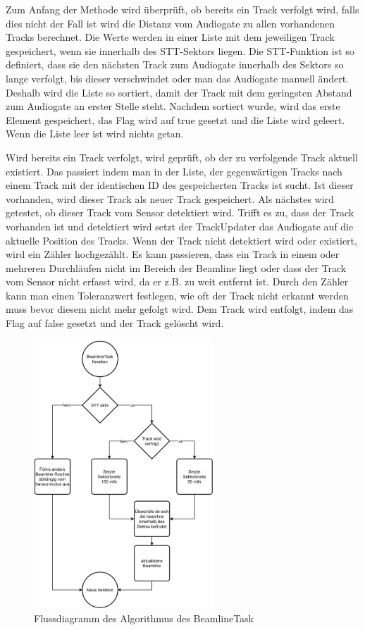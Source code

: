 Zum Anfang der Methode wird überprüft, ob bereits ein Track verfolgt wird, falls dies nicht der Fall ist wird die Distanz vom Audiogate zu allen 
vorhandenen Tracks berechnet. Die Werte werden in einer Liste mit dem jeweiligen Track gespeichert, wenn sie innerhalb des STT-Sektors liegen. Die 
STT-Funktion ist so definiert, dass sie den nächsten Track zum Audiogate innerhalb des Sektors so lange verfolgt, bis dieser verschwindet oder man das 
Audiogate manuell ändert. Deshalb wird die Liste so sortiert, damit der Track mit dem geringsten Abstand zum Audiogate an erster Stelle steht. Nachdem 
sortiert wurde, wird das erste Element gespeichert, das Flag wird auf true gesetzt und die Liste wird geleert. Wenn die Liste leer ist wird nichts getan. 

Wird bereits ein Track verfolgt, wird geprüft, ob der zu verfolgende Track aktuell existiert. Das passiert indem man in der Liste, der gegenwärtigen 
Tracks nach einem Track mit der identischen ID des gespeicherten Tracks ist sucht. Ist dieser vorhanden, wird dieser Track als neuer Track gespeichert. 
Als nächstes wird getestet, ob dieser Track vom Sensor detektiert wird.  Trifft es zu, dass der Track vorhanden ist und detektiert wird setzt der 
TrackUpdater das Audiogate auf die aktuelle Position des Tracks. Wenn der Track nicht detektiert wird oder existiert, wird ein Zähler hochgezählt. Es 
kann passieren, dass ein Track in einem oder mehreren Durchläufen nicht im Bereich der Beamline liegt oder dass der Track vom Sensor nicht erfasst wird, 
da er z.B. zu weit entfernt ist. Durch den Zähler kann man einen Toleranzwert festlegen, wie oft der Track nicht erkannt werden muss bevor diesem nicht 
mehr gefolgt wird. Dem Track wird entfolgt, indem das Flag auf false gesetzt und der Track gelöscht wird.

\begin{figure}[h]
    \centering
    \includegraphics[width=0.6\textwidth]{content/assets/BeamlineTaskSTT.png}
    \caption{Flussdiagramm des Algorithmus des BeamlineTask}
\end{figure}

